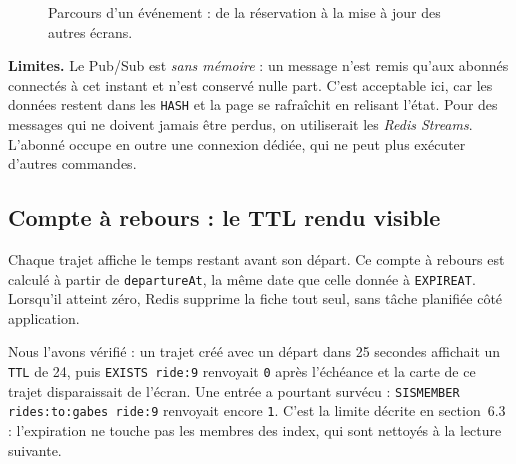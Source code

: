 \documentclass[11pt,a4paper]{article}
\newcommand{\cle}[1]{\texttt{\detokenize{#1}}}
\begin{document}
\begin{figure}[htbp]\centering
{}
\caption{Parcours d'un \'ev\'enement : de la r\'eservation \`a la mise \`a jour des autres \'ecrans.}
\end{figure}

\textbf{Limites.} Le Pub/Sub est \emph{sans m\'emoire} : un message n'est remis qu'aux abonn\'es connect\'es \`a cet instant et n'est conserv\'e nulle part. C'est acceptable ici, car les donn\'ees restent dans les \texttt{HASH} et la page se rafra\^ichit en relisant l'\'etat. Pour des messages qui ne doivent jamais \^etre perdus, on utiliserait les \emph{Redis Streams}. L'abonn\'e occupe en outre une connexion d\'edi\'ee, qui ne peut plus ex\'ecuter d'autres commandes.

\subsection{Compte \`a rebours : le TTL rendu visible}
Chaque trajet affiche le temps restant avant son d\'epart. Ce compte \`a rebours est calcul\'e \`a partir de \texttt{departureAt}, la m\^eme date que celle donn\'ee \`a \texttt{EXPIREAT}. Lorsqu'il atteint z\'ero, Redis supprime la fiche tout seul, sans t\^ache planifi\'ee c\^ot\'e application.

Nous l'avons v\'erifi\'e : un trajet cr\'e\'e avec un d\'epart dans 25 secondes affichait un \texttt{TTL} de 24, puis \texttt{EXISTS ride:9} renvoyait \texttt{0} apr\`es l'\'ech\'eance et la carte de ce trajet disparaissait de l'\'ecran. Une entr\'ee a pourtant surv\'ecu : \texttt{SISMEMBER rides:to:gabes ride:9} renvoyait encore \texttt{1}. C'est la limite d\'ecrite en section~6.3 : l'expiration ne touche pas les membres des index, qui sont nettoy\'es \`a la lecture suivante.
\end{document}
